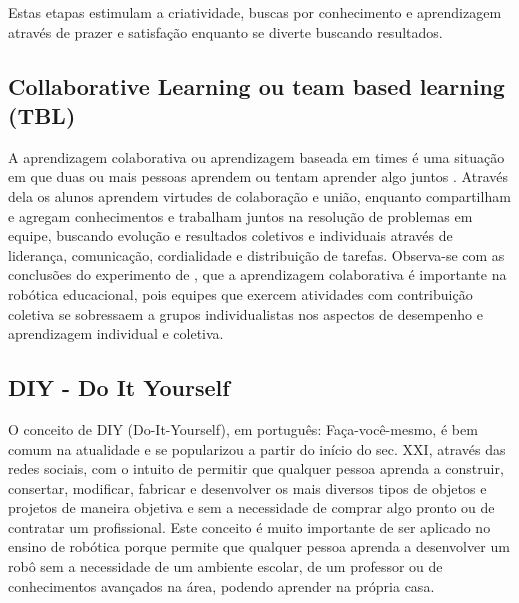 Estas etapas estimulam a criatividade, buscas por conhecimento e aprendizagem através de prazer e satisfação enquanto se diverte buscando resultados.

\subsection{Collaborative Learning ou team based learning (TBL)}\label{sec:tbl} 
A aprendizagem colaborativa ou aprendizagem baseada em times é uma situação em que duas ou mais pessoas aprendem ou tentam aprender algo juntos \cite{dillenbourg}. Através dela os alunos aprendem virtudes de colaboração e união, enquanto compartilham e agregam conhecimentos e trabalham juntos na resolução de problemas em equipe, buscando evolução e resultados coletivos e individuais através de liderança, comunicação, cordialidade e distribuição de tarefas. Observa-se com as conclusões do experimento de \cite{karahoca}, que a aprendizagem colaborativa é importante na robótica educacional, pois equipes que exercem atividades com contribuição coletiva se sobressaem a grupos individualistas nos aspectos de desempenho e aprendizagem individual e coletiva. 

\subsection{DIY - Do It Yourself}\label{sec:diy}
O conceito de DIY (Do-It-Yourself), em português: Faça-você-mesmo, é bem comum na atualidade e se popularizou a partir do início do sec. XXI, através das redes sociais, com o intuito de permitir que qualquer pessoa aprenda a construir, consertar, modificar, fabricar e desenvolver os mais diversos tipos de objetos e projetos de maneira objetiva e sem a necessidade de comprar algo pronto ou de contratar um profissional. Este conceito é muito importante de ser aplicado no ensino de robótica porque permite que qualquer pessoa aprenda a desenvolver um robô sem a necessidade de um ambiente escolar, de um professor ou de conhecimentos avançados na área, podendo aprender na própria casa.

